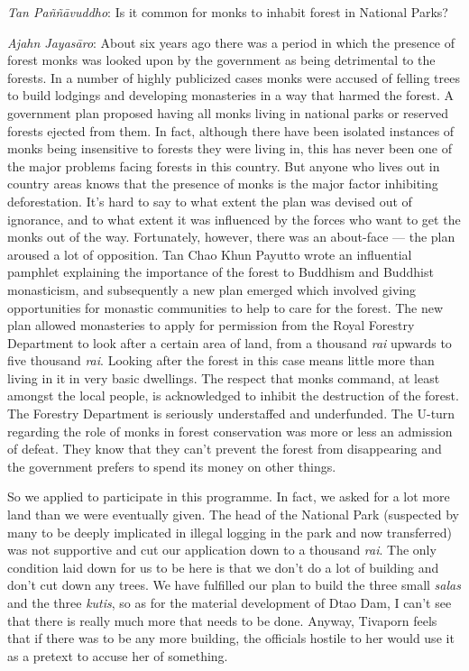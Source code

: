 \emph{Tan Paññāvuddho}‎: Is it common for monks to inhabit forest in
National Parks?

\emph{Ajahn Jayasāro‎}: About six years ago there was a period in which
the presence of forest monks was looked upon by the government as being
detrimental to the forests. In a number of highly publicized cases monks
were accused of felling trees to build lodgings and developing
monasteries in a way that harmed the forest. A government plan proposed
having all monks living in national parks or reserved forests ejected
from them. In fact, although there have been isolated instances of monks
being insensitive to forests they were living in, this has never been
one of the major problems facing forests in this country. But anyone who
lives out in country areas knows that the presence of monks is the major
factor inhibiting deforestation. It's hard to say to what extent the
plan was devised out of ignorance, and to what extent it was influenced
by the forces who want to get the monks out of the way. Fortunately,
however, there was an about-face --- the plan aroused a lot of
opposition. Tan Chao Khun Payutto wrote an influential pamphlet
explaining the importance of the forest to Buddhism and Buddhist
monasticism, and subsequently a new plan emerged which involved giving
opportunities for monastic communities to help to care for the forest.
The new plan allowed monasteries to apply for permission from the Royal
Forestry Department to look after a certain area of land, from a
thousand \emph{rai} upwards to five thousand \emph{rai}. Looking after
the forest in this case means little more than living in it in very
basic dwellings. The respect that monks command, at least amongst the
local people, is acknowledged to inhibit the destruction of the forest.
The Forestry Department is seriously understaffed and underfunded. The
U-turn regarding the role of monks in forest conservation was more or
less an admission of defeat. They know that they can't prevent the
forest from disappearing and the government prefers to spend its money
on other things.

So we applied to participate in this programme. In fact, we asked for a
lot more land than we were eventually given. The head of the National
Park (suspected by many to be deeply implicated in illegal logging in
the park and now transferred) was not supportive and cut our application
down to a thousand \emph{rai}. The only condition laid down for us to be
here is that we don't do a lot of building and don't cut down any trees.
We have fulfilled our plan to build the three small \emph{salas} and the
three \emph{kutis}, so as for the material development of Dtao Dam, I
can't see that there is really much more that needs to be done. Anyway,
Tivaporn feels that if there was to be any more building, the officials
hostile to her would use it as a pretext to accuse her of something.

